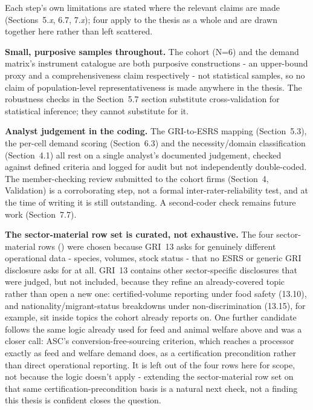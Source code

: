 \documentclass[
]{article}
\begin{document}
Each step's own limitations are stated where the relevant claims are made
(Sections~5.\emph{x}, 6.7, 7.\emph{x}); four apply to the thesis as a whole and
are drawn together here rather than left scattered.

\textbf{Small, purposive samples throughout.} The cohort (N=6) and the demand
matrix's instrument catalogue are both purposive constructions - an
upper-bound proxy and a comprehensiveness claim respectively - not
statistical samples, so no claim of population-level representativeness is
made anywhere in the thesis. The robustness checks in the
Section~5.7 section substitute cross-validation for
statistical inference; they cannot substitute for it.

\textbf{Analyst judgement in the coding.} The GRI-to-ESRS mapping
(Section~5.3), the per-cell demand scoring (Section~6.3) and the
necessity/domain classification (Section~4.1) all rest on a single analyst's
documented judgement, checked against defined criteria and logged for audit
but not independently double-coded. The member-checking review submitted to the
cohort firms (Section~4, Validation) is a corroborating step, not a formal
inter-rater-reliability test, and at the time of writing it is still outstanding.
A second-coder check remains future work (Section~7.7).

\textbf{The sector-material row set is curated, not exhaustive.} The four
sector-material rows () were chosen because GRI~13
asks for genuinely different operational data - species, volumes, stock
status - that no ESRS or generic GRI disclosure asks for at all. GRI~13
contains other sector-specific disclosures that were judged, but not
included, because they refine an already-covered topic rather than open a
new one: certified-volume reporting under food safety (13.10), and
nationality/migrant-status breakdowns under non-discrimination (13.15), for
example, sit inside topics the cohort already reports on. One further
candidate follows the same logic already used for feed and animal welfare
above and was a closer call: ASC's conversion-free-sourcing criterion, which
reaches a processor exactly as feed and welfare demand does, as a
certification precondition rather than direct operational reporting. It is
left out of the four rows here for scope, not because the logic doesn't
apply - extending the sector-material row set on that same
certification-precondition basis is a natural next check, not a finding
this thesis is confident closes the question.
\end{document}
